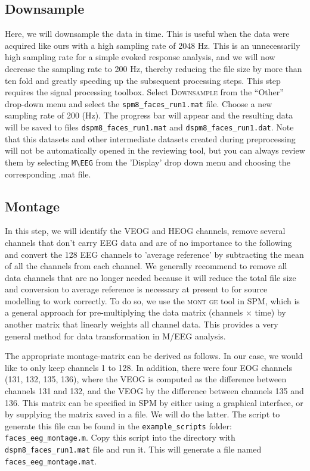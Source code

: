 \subsection{Downsample}
Here, we will downsample the data in time. This is useful when the data were acquired like ours with a high sampling rate of 2048 Hz. This is an unnecessarily high sampling rate for a simple evoked response analysis, and we will now decrease the sampling rate to 200 Hz, thereby reducing the file size by more than ten fold and greatly speeding up the subsequent processing steps. This step requires the signal processing toolbox. Select \textsc{Downsample} from the ``Other'' drop-down menu and select the \texttt{spm8\_faces_run1.mat} file. Choose a new sampling rate of 200 (Hz). The progress bar will appear and the resulting data will be saved to files \texttt{dspm8\_faces_run1.mat} and \texttt{dspm8\_faces_run1.dat}. Note that this datasets and other intermediate datasets created during preprocessing will not be automatically opened in the reviewing tool, but you can always review them by selecting \verb!M\EEG! from the 'Display' drop down menu and choosing the corresponding .mat file.


\subsection{Montage}

In this step, we will identify the VEOG and HEOG channels, remove several channels that don't carry EEG data and are of no importance to the following and convert the 128 EEG channels to 'average reference' by subtracting the mean of all the channels from each channel. We generally recommend to remove all data channels that are no longer needed because it will reduce the total file size and conversion to average reference is necessary at present to for source modelling to work correctly.  To do so, we use the \textsc{mont ge} tool in SPM, which is a general approach for pre-multiplying the data matrix (channels $\times$ time) by another matrix that linearly weights all channel data. This provides a very general method for data transformation in M/EEG analysis.

The appropriate montage-matrix can be derived as follows.
In our case, we would like to only keep channels 1 to 128. In addition, there were four EOG channels (131, 132, 135, 136), where the VEOG is computed as the difference between channels 131 and 132, and the VEOG by the difference between channels 135 and 136. This matrix can be specified in SPM by either using a graphical interface, or by supplying the matrix saved in a file. We will do the latter. The script to generate this file can be found in the \texttt{example\_scripts} folder: \texttt{faces\_eeg\_montage.m}. Copy this script into the directory with  \texttt{dspm8\_faces_run1.mat} file and run it. This will generate a file named \texttt{faces\_eeg\_montage.mat}.

